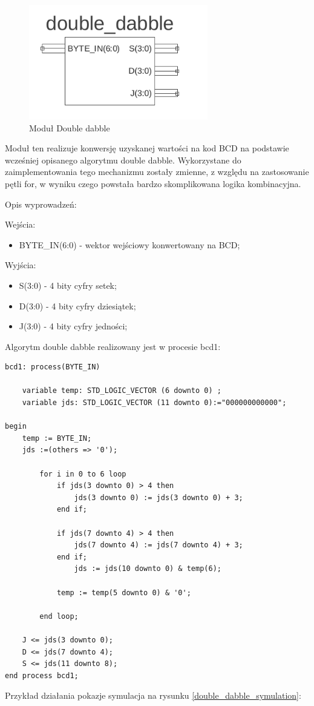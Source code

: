 \documentclass[a4paper]{article}
\begin{document}
\begin{figure}[H]
\begin{center}
\includegraphics[height=5cm]{graphics/double_dabble_sym.png}
\end{center}
\caption{Moduł Double dabble}
\label{double_dabble_sym}
\end{figure}

Moduł ten realizuje konwersję uzyskanej wartości na kod BCD na podstawie wcześniej opisanego algorytmu double dabble. Wykorzystane do zaimplementowania tego mechanizmu zostały zmienne, z względu na zastosowanie pętli for, w wyniku czego powstała bardzo skomplikowana logika kombinacyjna. 


Opis wyprowadzeń:

Wejścia:
\begin{itemize}
\item BYTE\_IN(6:0) - wektor wejściowy konwertowany na BCD;
\end{itemize}

Wyjścia:
\begin{itemize}
\item S(3:0) - 4 bity cyfry setek;
\item D(3:0) - 4 bity cyfry dziesiątek;
\item J(3:0) -  4 bity cyfry jedności;
\end{itemize}

Algorytm double dabble realizowany jest w procesie bcd1:

\lstset{language=VHDL}
\begin{lstlisting}[frame=single]
bcd1: process(BYTE_IN)

	variable temp: STD_LOGIC_VECTOR (6 downto 0) ;
	variable jds: STD_LOGIC_VECTOR (11 downto 0):="000000000000";

begin	
	temp := BYTE_IN; 
	jds :=(others => '0');

		for i in 0 to 6 loop
			if jds(3 downto 0) > 4 then 
				jds(3 downto 0) := jds(3 downto 0) + 3;
			end if;
     
			if jds(7 downto 4) > 4 then 
				jds(7 downto 4) := jds(7 downto 4) + 3;
			end if;
				jds := jds(10 downto 0) & temp(6);
			 
			temp := temp(5 downto 0) & '0';
			
		end loop;
		
	J <= jds(3 downto 0);
	D <= jds(7 downto 4);
	S <= jds(11 downto 8);
end process bcd1; 
\end{lstlisting}
Przykład działania pokazje symulacja na rysunku \ref{double_dabble_symulation}:
\end{document}
